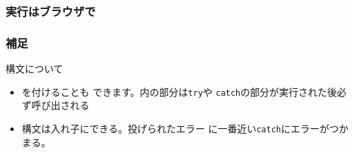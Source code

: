 \documentclass[dvipsk]{beamer}
\begin{document}
\begin{frame}[containsverbatim]
 \frametitle{実行はブラウザで}
\end{frame}
\begin{frame}[containsverbatim]
 \frametitle{補足}
構文について
\begin{itemize}
 \item {}を付けることも
できます。内の部分は\texttt{try}や
\texttt{catch}の部分が実行された後必ず呼び出される
 \item {}構文は入れ子にできる。投げられたエラー
			 に一番近い\texttt{catch}にエラーがつかまる。
\end{itemize}
\end{frame}
\end{document}
